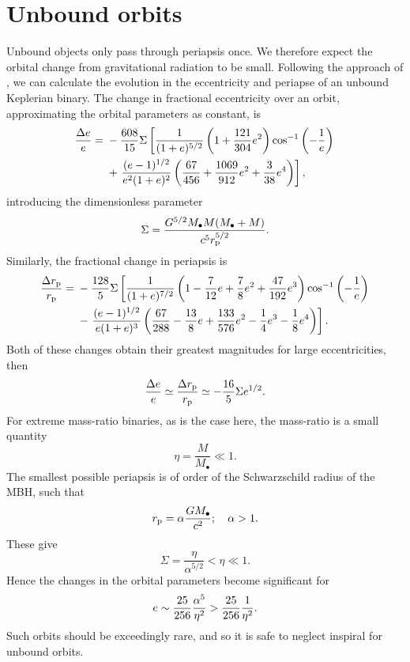 \section{Unbound orbits}\label{ap:Unbound}

Unbound objects only pass through periapsis once. We therefore expect the orbital change from gravitational radiation to be small. Following the approach of \citet{Turner1977}, we can calculate the evolution in the eccentricity and periapse of an unbound Keplerian binary. The change in fractional eccentricity over an orbit, approximating the orbital parameters as constant, is
\begin{align}
\dfrac{\Delta e}{e} = {} & -\dfrac{608}{15}\Sigma\left[\dfrac{1}{(1+e)^{5/2}}\left(1 + \dfrac{121}{304}e^2\right)\cos^{-1}\left(-\dfrac{1}{e}\right) \right. \nonumber \\*  {} & + \left. \dfrac{(e - 1)^{1/2}}{e^2(1+e)^2}\left(\dfrac{67}{456} + \dfrac{1069}{912}e^2 + \dfrac{3}{38}e^4\right)\right],
\end{align}
introducing the dimensionless parameter
\begin{equation}
\Sigma = \dfrac{G^{5/2}M_\bullet M(M_\bullet+ M)}{c^5r_\mathrm{p}^{5/2}}.
\end{equation}
Similarly, the fractional change in periapsis is
\begin{align}
\dfrac{\Delta r_\mathrm{p}}{r_\mathrm{p}} = {} & -\dfrac{128}{5}\Sigma\left[\dfrac{1}{(1+e)^{7/2}}\left(1 - \dfrac{7}{12}e + \dfrac{7}{8}e^2 + \dfrac{47}{192}e^3\right)\cos^{-1}\left(-\dfrac{1}{e}\right) \right. \nonumber \\*
 {} & - \left. \dfrac{(e - 1)^{1/2}}{e(1 + e)^3}\left(\dfrac{67}{288} - \dfrac{13}{8}e + \dfrac{133}{576}e^2 - \dfrac{1}{4}e^3 - \dfrac{1}{8}e^4\right)\right].
\end{align}
Both of these changes obtain their greatest magnitudes for large eccentricities, then
\begin{equation}
\dfrac{\Delta e}{e} \simeq \dfrac{\Delta r_\mathrm{p}}{r_\mathrm{p}} \simeq -\dfrac{16}{5}\Sigma e^{1/2}.
\end{equation}
For extreme mass-ratio binaries, as is the case here, the mass-ratio is a small quantity
\begin{equation}
\eta = \dfrac{M}{M_\bullet} \ll 1.
\end{equation}
The smallest possible periapsis is of order of the Schwarzschild radius of the MBH, such that 
\begin{equation}
r_\mathrm{p} = \alpha\dfrac{GM_\bullet}{c^2}; \quad \alpha > 1.
\end{equation}
These give
\begin{equation}
\Sigma = \dfrac{\eta}{\alpha^{5/2}} < \eta \ll 1.
\end{equation}
Hence the changes in the orbital parameters become significant for
\begin{equation}
e \sim \dfrac{25}{256}\dfrac{\alpha^5}{\eta^2} > \dfrac{25}{256}\dfrac{1}{\eta^2}.
\end{equation}
Such orbits should be exceedingly rare, and so it is safe to neglect inspiral for unbound orbits.
